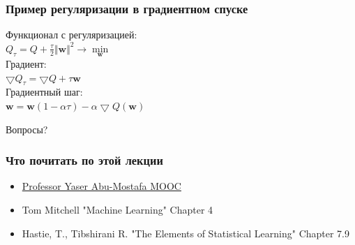 \documentclass[10pt]{beamer}
\begin{document}

{
\begin{frame}\frametitle{Пример регуляризации в градиентном спуске}
	Функционал с регуляризацией:\\
	$Q_{\tau} = Q + \frac{\tau}{2}\Vert \mathbf{w} \Vert^2 \rightarrow \min\limits_{\mathbf{w}}$\\
	\bigbreak
	Градиент:\\
	$\bigtriangledown Q_{\tau} = \bigtriangledown Q + \tau \mathbf{w}$\\
	\bigbreak
	Градиентный шаг:\\
	$\mathbf{w} = \mathbf{w}(1-\alpha \tau) - \alpha \bigtriangledown Q(\mathbf{w})$\\
\end{frame}
}

\begin{frame}[standout]
  Вопросы?
\end{frame}

\appendix

\begin{frame}\frametitle{Что почитать по этой лекции}
  \begin{itemize}
    \item \href{http://work.caltech.edu/telecourse.html}{Professor Yaser Abu-Mostafa MOOC}
    \item Tom Mitchell "Machine Learning" Chapter 4
    \item  Hastie, T., Tibshirani R. "The Elements of Statistical Learning" Chapter 7.9 
  \end{itemize}
\end{frame}
\end{document}
